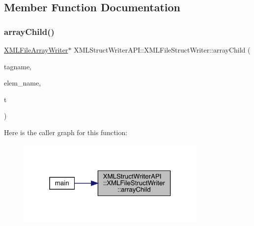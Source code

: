 \subsection{Member Function Documentation}
\mbox{\label{classXMLStructWriterAPI_1_1XMLFileStructWriter_a45906f3eaab392974dde2da7cf1fef05}} 
\subsubsection{\texorpdfstring{arrayChild()}{arrayChild()}\hspace{0.1cm}{\footnotesize\ttfamily [1/3]}}
{\footnotesize\ttfamily \mbox{\hyperlink{classXMLStructWriterAPI_1_1XMLFileArrayWriter}{X\+M\+L\+File\+Array\+Writer}}$\ast$ X\+M\+L\+Struct\+Writer\+A\+P\+I\+::\+X\+M\+L\+File\+Struct\+Writer\+::array\+Child (\begin{DoxyParamCaption}\item[{const std\+::string \&}]{tagname,  }\item[{const std\+::string \&}]{elem\+\_\+name,  }\item[{\mbox{\hyperlink{namespaceXMLStructWriterAPI_a2017208be87c77a32bdc19ea2f14d032}{Array\+Type}}}]{t }\end{DoxyParamCaption})}

Here is the caller graph for this function\+:
\nopagebreak
\begin{figure}[H]
\begin{center}
\leavevmode
\includegraphics[width=265pt]{db/de3/classXMLStructWriterAPI_1_1XMLFileStructWriter_a45906f3eaab392974dde2da7cf1fef05_icgraph}
\end{center}
\end{figure}
\mbox{\label{classXMLStructWriterAPI_1_1XMLFileStructWriter_a45906f3eaab392974dde2da7cf1fef05}} 
